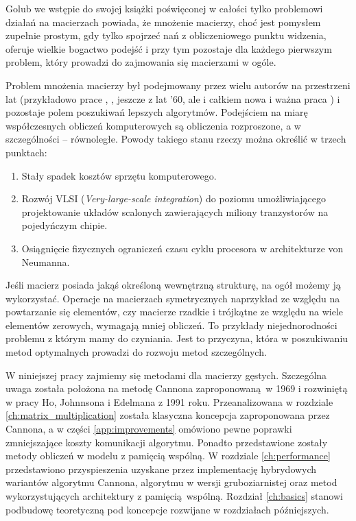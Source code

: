 Golub\cite{Golub} we wstępie do swojej książki poświęconej w całości tylko problemowi działań na macierzach powiada, że mnożenie macierzy, choć jest pomysłem zupełnie prostym, gdy tylko spojrzeć nań z obliczeniowego punktu widzenia, oferuje wielkie bogactwo podejść i przy tym pozostaje dla każdego pierwszym problem, który prowadzi do zajmowania się macierzami w ogóle. 


Problem mnożenia macierzy był podejmowany przez wielu autorów na przestrzeni lat (przykładowo prace \cite{Strassen68}, \cite{Winograd}, \cite{Cannon:1969:CCI:905686} jeszcze z lat '60, ale i całkiem nowa i ważna praca \cite{DBLP:journals/corr/abs-1202-3173}) i pozostaje polem poszukiwań lepszych algorytmów. Podejściem na miarę współczesnych obliczeń komputerowych są obliczenia rozproszone, a w szczególności -- równoległe. Powody takiego stanu rzeczy można określić w trzech punktach:
\begin{enumerate}
\item{Stały spadek kosztów sprzętu komputerowego.}
\item{Rozwój VLSI (\emph{Very-large-scale integration}) do poziomu umożliwiającego projektowanie układów scalonych zawierających miliony tranzystorów na pojedyńczym chipie.}
\item{Osiągnięcie fizycznych ograniczeń czasu cyklu procesora w architekturze von Neumanna.}
\end{enumerate}


Jeśli macierz posiada jakąś określoną wewnętrzną strukturę, na ogół możemy ją wykorzystać. Operacje na macierzach symetrycznych naprzykład ze względu na powtarzanie się elementów, czy macierze rzadkie i trójkątne ze względu na wiele elementów zerowych, wymagają mniej obliczeń. To przykłady niejednorodności problemu z którym mamy do czyniania. Jest to przyczyna, która w poszukiwaniu metod optymalnych prowadzi do rozwoju metod szczególnych. 


W niniejszej pracy zajmiemy się metodami dla macierzy gęstych. Szczególna uwaga została położona na metodę Cannona\cite{Cannon:1969:CCI:905686} zaproponowaną w 1969 i rozwiniętą w pracy Ho, Johnnsona i Edelmana\cite{Ching-TienHo1991} z 1991 roku. Przeanalizowana w rozdziale \ref{ch:matrix_multiplication} została klasyczna koncepcja zaproponowana przez Cannona, a w części \ref{app:improvements} omówiono pewne poprawki zmniejszające koszty komunikacji algorytmu. Ponadto przedstawione zostały metody obliczeń w modelu z pamięcią wspólną. W rozdziale \ref{ch:performance} przedstawiono przyspieszenia uzyskane przez implementację hybrydowych wariantów algorytmu Cannona, algorytmu w wersji gruboziarnistej oraz metod wykorzystujących architektury z pamięcią wspólną.
Rozdział \ref{ch:basics} stanowi podbudowę teoretyczną pod koncepcje rozwijane w rozdziałach późniejszych.


